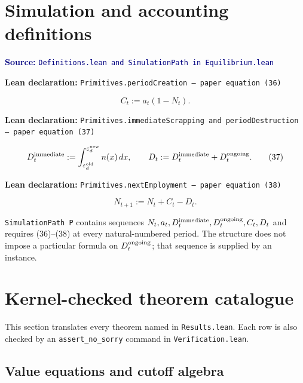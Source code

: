 \documentclass[11pt]{article}
\newcommand{\code}[1]{\texttt{#1}}
\newcommand{\leanfile}[1]{\texttt{#1}}
\newcommand{\epsd}{\varepsilon_d}
\newcommand{\decl}[1]{\par\smallskip\noindent\colorbox{softblue}{\parbox{0.965\linewidth}{\textbf{Lean declaration:} \code{#1}}}\par\smallskip}
\newcommand{\source}[1]{\textcolor{navy}{\small\textbf{Source:} \leanfile{#1}}}
\begin{document}
\section{Simulation and accounting definitions}

\source{Definitions.lean and SimulationPath in Equilibrium.lean}

\decl{Primitives.periodCreation --- paper equation (36)}
\begin{equation}
C_t:=a_t(1-N_t). \tag{36}
\end{equation}

\decl{Primitives.immediateScrapping and periodDestruction --- paper equation (37)}
\begin{equation}
D_t^{\rm immediate}:=\int_{\epsd^{\rm old}}^{\epsd^{\rm new}}n(x)\,dx,
\qquad
D_t:=D_t^{\rm immediate}+D_t^{\rm ongoing}. \tag{37}
\end{equation}

\decl{Primitives.nextEmployment --- paper equation (38)}
\begin{equation}
N_{t+1}:=N_t+C_t-D_t. \tag{38}
\end{equation}

\code{SimulationPath P} contains sequences $N_t,a_t,D_t^{\rm immediate},
D_t^{\rm ongoing},C_t,D_t$ and requires (36)--(38) at every natural-numbered
period. The structure does not impose a particular formula on
$D_t^{\rm ongoing}$; that sequence is supplied by an instance.

\section{Kernel-checked theorem catalogue}
\label{sec:theorems}

This section translates every theorem named in \leanfile{Results.lean}. Each row is
also checked by an \code{assert\_no\_sorry} command in \leanfile{Verification.lean}.

\subsection{Value equations and cutoff algebra}
\end{document}
